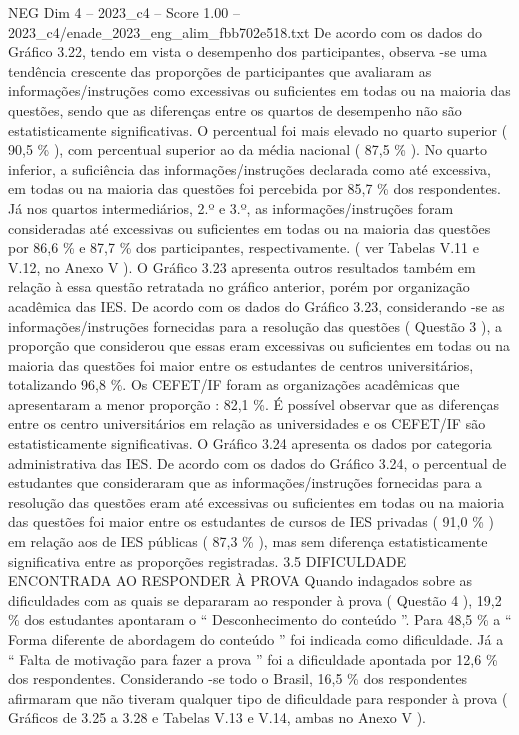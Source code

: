 \begin{textsample}{NEG Dim 4 – 2023\_c4 – Score 1.00 – 2023\_c4/enade\_2023\_eng\_alim\_fbb702e518.txt}
De acordo com os dados do Gráfico 3.22, tendo em vista o desempenho dos participantes, observa -se uma tendência crescente das proporções de participantes que avaliaram as informações/instruções como excessivas ou suficientes em todas ou na maioria das questões, sendo que as diferenças entre os quartos de desempenho não são estatisticamente significativas.
O percentual foi mais elevado no quarto superior ( 90,5 \% ), com percentual superior ao da média nacional ( 87,5 \% ).
No quarto inferior, a suficiência das informações/instruções declarada como até excessiva, em todas ou na maioria das questões foi percebida por 85,7 \% dos respondentes.
Já nos quartos intermediários, 2.º e 3.º, as informações/instruções foram consideradas até excessivas ou suficientes em todas ou na maioria das questões por 86,6 \% e 87,7 \% dos participantes, respectivamente. ( ver Tabelas V.11 e V.12, no Anexo V ).
O Gráfico 3.23 apresenta outros resultados também em relação à essa questão retratada no gráfico anterior, porém por organização acadêmica das IES.
De acordo com os dados do Gráfico 3.23, considerando -se as informações/instruções fornecidas para a resolução das questões ( Questão 3 ), a proporção que considerou que essas eram excessivas ou suficientes em todas ou na maioria das questões foi maior entre os estudantes de centros universitários, totalizando 96,8 \%.
Os CEFET/IF foram as organizações acadêmicas que apresentaram a menor proporção : 82,1 \%.
É possível observar que as diferenças entre os centro universitários em relação as universidades e os CEFET/IF são estatisticamente significativas.
O Gráfico 3.24 apresenta os dados por categoria administrativa das IES.
De acordo com os dados do Gráfico 3.24, o percentual de estudantes que consideraram que as informações/instruções fornecidas para a resolução das questões eram até excessivas ou suficientes em todas ou na maioria das questões foi maior entre os estudantes de cursos de IES privadas ( 91,0 \% ) em relação aos de IES públicas ( 87,3 \% ), mas sem diferença estatisticamente significativa entre as proporções registradas. 3.5 DIFICULDADE ENCONTRADA AO RESPONDER À PROVA Quando indagados sobre as dificuldades com as quais se depararam ao responder à prova ( Questão 4 ), 19,2 \% dos estudantes apontaram o “ Desconhecimento do conteúdo ”.
Para 48,5 \% a “ Forma diferente de abordagem do conteúdo ” foi indicada como dificuldade.
Já a “ Falta de motivação para fazer a prova ” foi a dificuldade apontada por 12,6 \% dos respondentes.
Considerando -se todo o Brasil, 16,5 \% dos respondentes afirmaram que não tiveram qualquer tipo de dificuldade para responder à prova ( Gráficos de 3.25 a 3.28 e Tabelas V.13 e V.14, ambas no Anexo V ).

\end{textsample}
